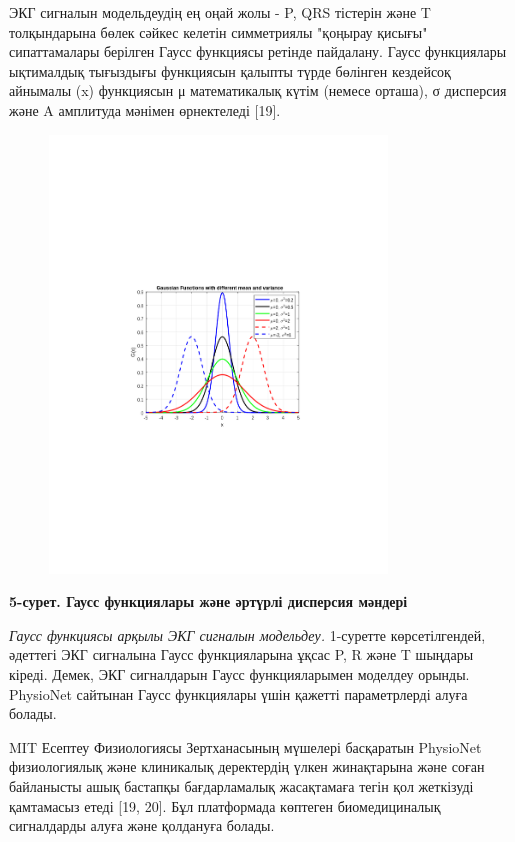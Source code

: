 {ЭКГ сигналын модельдеудің ең оңай жолы - P, QRS тістерін және T
толқындарына бөлек сәйкес келетін симметриялы "қоңырау қисығы"
сипаттамалары берілген Гаусс функциясы ретінде пайдалану. Гаусс
функциялары ықтималдық тығыздығы функциясын қалыпты түрде бөлінген
кездейсоқ айнымалы (x) функциясын μ математикалық күтім (немесе орташа),
σ дисперсия және A амплитуда мәнімен өрнектеледі {[}19{]}.

\begin{figure}[H]
	\centering
	\includegraphics[width=0.8\textwidth]{media/ict/image44}
	\caption*{}
\end{figure}


{\bfseries 5-сурет. Гаусс функциялары және әртүрлі дисперсия мәндері}

\emph{Гаусс функциясы арқылы ЭКГ сигналын модельдеу.} 1-суретте
көрсетілгендей, әдеттегі ЭКГ сигналына Гаусс функцияларына ұқсас P, R
және T шыңдары кіреді. Демек, ЭКГ сигналдарын Гаусс функцияларымен
моделдеу орынды. PhysioNet сайтынан Гаусс функциялары үшін қажетті
параметрлерді алуға болады.

MIT Есептеу Физиологиясы Зертханасының мүшелері басқаратын PhysioNet
физиологиялық және клиникалық деректердің үлкен жинақтарына және соған
байланысты ашық бастапқы бағдарламалық жасақтамаға тегін қол жеткізуді
қамтамасыз етеді {[}19, 20{]}. Бұл платформада көптеген биомедициналық
сигналдарды алуға және қолдануға болады.

}
